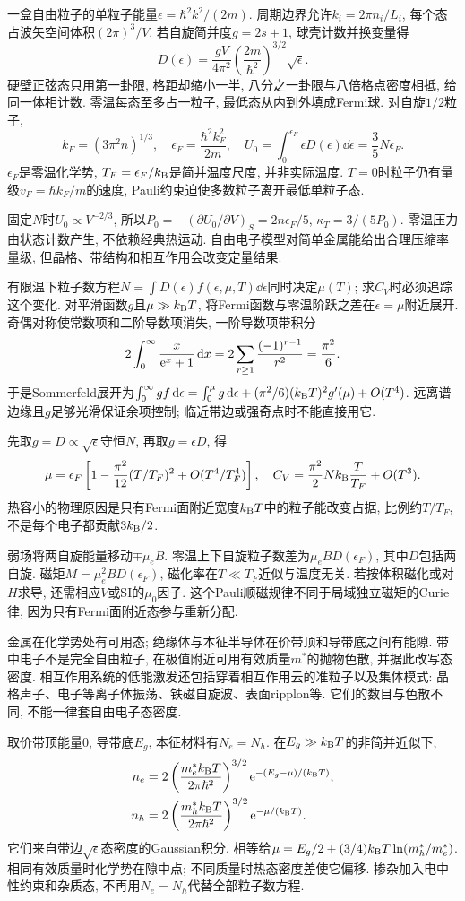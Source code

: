 \label{ch:fermi}
一盒自由粒子的单粒子能量$\epsilon=\hbar^2k^2/(2m)$. 周期边界允许$k_i=2\pi n_i/L_i$, 每个态占波矢空间体积$(2\pi)^3/V$. 若自旋简并度$g=2s+1$, 球壳计数并换变量得
\[
D(\epsilon)=\frac{gV}{4\pi^2}\left(\frac{2m}{\hbar^2}\right)^{3/2}\sqrt\epsilon.
\]
硬壁正弦态只用第一卦限, 格距却缩小一半, 八分之一卦限与八倍格点密度相抵, 给同一体相计数. 零温每态至多占一粒子, 最低态从内到外填成Fermi球. 对自旋$1/2$粒子,
\[
k_F=(3\pi^2n)^{1/3},\quad \epsilon_F=\frac{\hbar^2k_F^2}{2m},\quad
U_0=\int_0^{\epsilon_F}\epsilon D(\epsilon)\dd\epsilon=\frac35N\epsilon_F.
\]
$\epsilon_F$是零温化学势, $T_F=\epsilon_F/k_{\mathrm B}$是简并温度尺度, 并非实际温度. $T=0$时粒子仍有量级$v_F=\hbar k_F/m$的速度, Pauli约束迫使多数粒子离开最低单粒子态.

固定$N$时$U_0\propto V^{-2/3}$, 所以$P_0=-(\partial U_0/\partial V)_S=2n\epsilon_F/5$, $\kappa_T=3/(5P_0)$. 零温压力由状态计数产生, 不依赖经典热运动. 自由电子模型对简单金属能给出合理压缩率量级, 但晶格、带结构和相互作用会改变定量结果.

有限温下粒子数方程$N=\int D(\epsilon)f(\epsilon,\mu,T)\dd\epsilon$同时决定$\mu(T)$; 求$C_V$时必须追踪这个变化. 对平滑函数$g$且$\mu\gg k_{\mathrm B} T$, 将Fermi函数与零温阶跃之差在$\epsilon=\mu$附近展开. 奇偶对称使常数项和二阶导数项消失, 一阶导数项带积分
\[
2\int_0^\infty\frac{x}{\mathrm e^x+1}\,\mathrm d x
=2\sum_{r\ge1}\frac{(-1)^{r-1}}{r^2}=\frac{\pi^2}{6}.
\]
于是Sommerfeld展开为$\int_0^\infty g f\,\mathrm d\epsilon=\int_0^\mu g\,\mathrm d\epsilon+(\pi^2/6)(k_{\mathrm B} T)^2g'(\mu)+O(T^4)$. 远离谱边缘且$g$足够光滑保证余项控制; 临近带边或强奇点时不能直接用它.

先取$g=D\propto\sqrt\epsilon$守恒$N$, 再取$g=\epsilon D$, 得
\[
\mu=\epsilon_F\left[1-\frac{\pi^2}{12}(T/T_F)^2+O(T^4/T_F^4)\right],
\quad C_V=\frac{\pi^2}{2}Nk_{\mathrm B}\frac T{T_F}+O(T^3).
\]
热容小的物理原因是只有Fermi面附近宽度$k_{\mathrm B} T$中的粒子能改变占据, 比例约$T/T_F$, 不是每个电子都贡献$3k_{\mathrm B}/2$.

弱场将两自旋能量移动$\mp\mu_eB$. 零温上下自旋粒子数差为$\mu_eBD(\epsilon_F)$, 其中$D$包括两自旋. 磁矩$M=\mu_e^2BD(\epsilon_F)$, 磁化率在$T\ll T_F$近似与温度无关. 若按体积磁化或对$H$求导, 还需相应$V$或SI的$\mu_0$因子. 这个Pauli顺磁规律不同于局域独立磁矩的Curie律, 因为只有Fermi面附近态参与重新分配.

金属在化学势处有可用态; 绝缘体与本征半导体在价带顶和导带底之间有能隙. 带中电子不是完全自由粒子, 在极值附近可用有效质量$m^*$的抛物色散, 并据此改写态密度. 相互作用系统的低能激发还包括穿着相互作用云的准粒子以及集体模式: 晶格声子、电子等离子体振荡、铁磁自旋波、表面ripplon等. 它们的数目与色散不同, 不能一律套自由电子态密度.

取价带顶能量0, 导带底$E_g$, 本征材料有$N_e=N_h$. 在$E_g\gg k_{\mathrm B} T$的非简并近似下,
\[
\begin{aligned}
 n_e&=2\left(\frac{m_e^*k_{\mathrm B} T}{2\pi\hbar^2}\right)^{3/2}\mathrm e^{-(E_g-\mu)/(k_{\mathrm B} T)},\\
 n_h&=2\left(\frac{m_h^*k_{\mathrm B} T}{2\pi\hbar^2}\right)^{3/2}\mathrm e^{-\mu/(k_{\mathrm B} T)}.
\end{aligned}
\]
它们来自带边$\sqrt\epsilon$态密度的Gaussian积分. 相等给$\mu=E_g/2+(3/4)k_{\mathrm B} T\ln(m_h^*/m_e^*)$. 相同有效质量时化学势在隙中点; 不同质量时热态密度差使它偏移. 掺杂加入电中性约束和杂质态, 不再用$N_e=N_h$代替全部粒子数方程.
